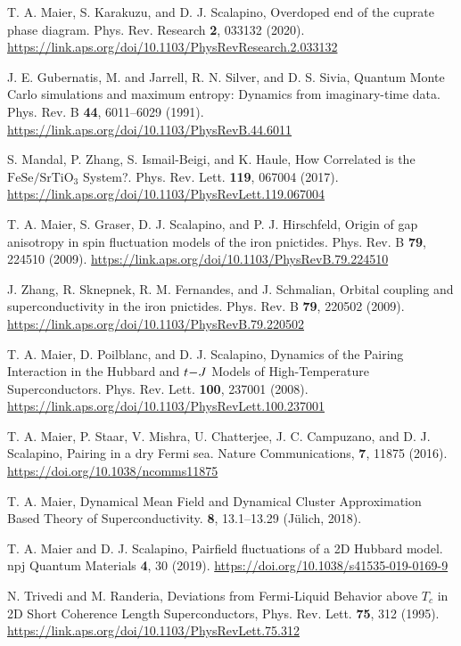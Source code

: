 \documentclass[prb,twocolumn,amsmath,amssymb,superscriptaddress,floatfix,nofootinbib]{revtex4-2}
\begin{document}
\begin{thebibliography}{}
T. A. Maier, S. Karakuzu, and D. J. Scalapino, {Overdoped end of the cuprate phase diagram}. {Phys. Rev. Research} {\bf 2}, 033132 (2020). 
\url{https://link.aps.org/doi/10.1103/PhysRevResearch.2.033132}

J. E. Gubernatis, M. and Jarrell, R. N. Silver, and D. S. Sivia, {Quantum {Monte Carlo} simulations and maximum entropy: Dynamics from imaginary-time data}. Phys. Rev. B {\bf 44}, {6011--6029} (1991). \url{https://link.aps.org/doi/10.1103/PhysRevB.44.6011}


S. Mandal, P. Zhang, S. Ismail-Beigi, and K. Haule, {How Correlated is the {$\mathrm{{FeSe}}/{\mathrm{SrTiO}}_{3}$} System?}. Phys. Rev. Lett. {\bf 119}, 067004 (2017). \url{https://link.aps.org/doi/10.1103/PhysRevLett.119.067004}

T. A. Maier, S. Graser, D. J. Scalapino, and P. J. Hirschfeld, {Origin of gap anisotropy in spin fluctuation models of the iron pnictides}. Phys. Rev. B 
{\bf 79}, 224510 (2009). \url{https://link.aps.org/doi/10.1103/PhysRevB.79.224510}

J. Zhang, R. Sknepnek, R. M. Fernandes, and J. Schmalian, {Orbital coupling and superconductivity in the iron pnictides}. Phys. Rev. B {\bf 79}, 220502 (2009). 
\url{https://link.aps.org/doi/10.1103/PhysRevB.79.220502}

T. A. Maier, D. Poilblanc, and D. J. Scalapino, {Dynamics of the Pairing Interaction in the {{Hubbard}} and {$t\mathrm{\text{\ensuremath{-}}}J$} Models of High-Temperature Superconductors}. Phys. Rev. Lett. {\bf 100}, 237001 (2008). \url{https://link.aps.org/doi/10.1103/PhysRevLett.100.237001}

T. A. Maier, P. Staar, V. Mishra, U. Chatterjee, J. C. Campuzano, and D. J. Scalapino, {Pairing in a dry {Fermi} sea}. {Nature Communications}, {\bf 7}, 11875 (2016). \url{https://doi.org/10.1038/ncomms11875}

T. A. Maier, {Dynamical Mean Field and Dynamical Cluster Approximation Based Theory of Superconductivity}. {\bf 8}, 13.1--13.29 (J{\"{u}}lich, 2018). 

T. A. Maier and D. J. Scalapino, Pairfield fluctuations of a {2D} {Hubbard} model. npj Quantum Materials {\bf 4}, 30 (2019). \url{https://doi.org/10.1038/s41535-019-0169-9}

N. Trivedi and M. Randeria, {Deviations from Fermi-Liquid Behavior above ${T}_{c}$ in 2D Short Coherence Length Superconductors}, {Phys. Rev. Lett.} {\bf 75}, 312 (1995). 
\url{https://link.aps.org/doi/10.1103/PhysRevLett.75.312}

\end{thebibliography}
\end{document}
